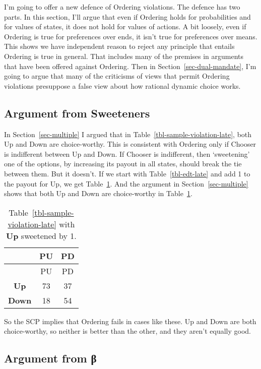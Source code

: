 \documentclass[
  10pt,
  letterpaper,
  DIV=11,
  numbers=noendperiod,
  twoside]{scrartcl}
\begin{document}
I'm going to offer a new defence of Ordering violations. The defence has
two parts. In this section, I'll argue that even if Ordering holds for
probabilities and for values of states, it does not hold for values of
actions. A bit loosely, even if Ordering is true for preferences over
ends, it isn't true for preferences over means. This shows we have
independent reason to reject any principle that entails Ordering is true
in general. That includes many of the premises in arguments that have
been offered against Ordering. Then in Section~\ref{sec-dual-mandate},
I'm going to argue that many of the criticisms of views that permit
Ordering violations presuppose a false view about how rational dynamic
choice works.

\subsection{Argument from Sweeteners}\label{sec-sweeteners}

In Section~\ref{sec-multiple} I argued that in
Table~\ref{tbl-sample-violation-late}, both Up and Down are
choice-worthy. This is consistent with Ordering only if Chooser is
indifferent between Up and Down. If Chooser is indifferent, then
`sweetening' one of the options, by increasing its payout in all states,
should break the tie between them. But it doesn't. If we start with
Table~\ref{tbl-edt-late} and add 1 to the payout for Up, we get
Table~\ref{tbl-sweetened}. And the argument in
Section~\ref{sec-multiple} shows that both Up and Down are choice-worthy
in Table~\ref{tbl-sweetened}.

\begin{longtable}[]{@{}ccc@{}}
\caption{Table~\ref{tbl-sample-violation-late} with \textbf{Up}
sweetened by 1.}\label{tbl-sweetened}\tabularnewline
\toprule\noalign{}
& PU & PD \\
\midrule\noalign{}
\endfirsthead
\toprule\noalign{}
& PU & PD \\
\midrule\noalign{}
\endhead
\bottomrule\noalign{}
\endlastfoot
\textbf{Up} & 73 & 37 \\
\textbf{Down} & 18 & 54 \\
\end{longtable}

So the SCP implies that Ordering fails in cases like these. Up and Down
are both choice-worthy, so neither is better than the other, and they
aren't equally good.

\subsection{Argument from β}\label{sec-ux3b2}
\end{document}
